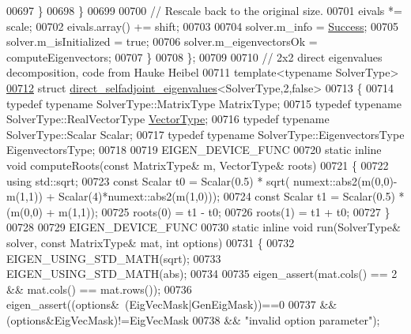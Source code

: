 \begin{DoxyCode}
00697       \}
00698     \}
00699 
00700     \textcolor{comment}{// Rescale back to the original size.}
00701     eivals *= scale;
00702     eivals.array() += shift;
00703     
00704     solver.m\_info = \hyperlink{group__enums_gga85fad7b87587764e5cf6b513a9e0ee5ea52581b035f4b59c203b8ff999ef5fcea}{Success};
00705     solver.m\_isInitialized = \textcolor{keyword}{true};
00706     solver.m\_eigenvectorsOk = computeEigenvectors;
00707   \}
00708 \};
00709 
00710 \textcolor{comment}{// 2x2 direct eigenvalues decomposition, code from Hauke Heibel}
00711 \textcolor{keyword}{template}<\textcolor{keyword}{typename} SolverType> 
\hyperlink{struct_eigen_1_1internal_1_1direct__selfadjoint__eigenvalues_3_01_solver_type_00_012_00_01false_01_4}{00712} \textcolor{keyword}{struct }\hyperlink{struct_eigen_1_1internal_1_1direct__selfadjoint__eigenvalues}{direct\_selfadjoint\_eigenvalues}<SolverType,2,false>
00713 \{
00714   \textcolor{keyword}{typedef} \textcolor{keyword}{typename} SolverType::MatrixType MatrixType;
00715   \textcolor{keyword}{typedef} \textcolor{keyword}{typename} SolverType::RealVectorType \hyperlink{struct_vector_type}{VectorType};
00716   \textcolor{keyword}{typedef} \textcolor{keyword}{typename} SolverType::Scalar Scalar;
00717   \textcolor{keyword}{typedef} \textcolor{keyword}{typename} SolverType::EigenvectorsType EigenvectorsType;
00718   
00719   EIGEN\_DEVICE\_FUNC
00720   \textcolor{keyword}{static} \textcolor{keyword}{inline} \textcolor{keywordtype}{void} computeRoots(\textcolor{keyword}{const} MatrixType& m, VectorType& roots)
00721   \{
00722     \textcolor{keyword}{using} std::sqrt;
00723     \textcolor{keyword}{const} Scalar t0 = Scalar(0.5) * sqrt( numext::abs2(m(0,0)-m(1,1)) + Scalar(4)*numext::abs2(m(1,0)));
00724     \textcolor{keyword}{const} Scalar t1 = Scalar(0.5) * (m(0,0) + m(1,1));
00725     roots(0) = t1 - t0;
00726     roots(1) = t1 + t0;
00727   \}
00728   
00729   EIGEN\_DEVICE\_FUNC
00730   \textcolor{keyword}{static} \textcolor{keyword}{inline} \textcolor{keywordtype}{void} run(SolverType& solver, \textcolor{keyword}{const} MatrixType& mat, \textcolor{keywordtype}{int} options)
00731   \{
00732     EIGEN\_USING\_STD\_MATH(sqrt);
00733     EIGEN\_USING\_STD\_MATH(abs);
00734     
00735     eigen\_assert(mat.cols() == 2 && mat.cols() == mat.rows());
00736     eigen\_assert((options&~(EigVecMask|GenEigMask))==0
00737             && (options&EigVecMask)!=EigVecMask
00738             && \textcolor{stringliteral}{"invalid option parameter"});

\end{DoxyCode}
